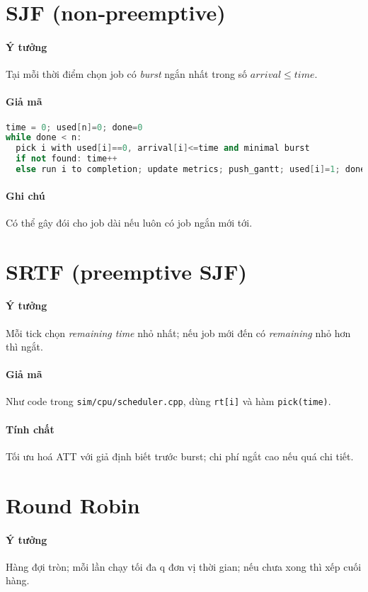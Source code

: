 \documentclass[12pt,a4paper]{report}
\begin{document}
\section{SJF (non‑preemptive)}
\paragraph{Ý tưởng} Tại mỗi thời điểm chọn job có \textit{burst} ngắn nhất trong số \(arrival \le time\).
\paragraph{Giả mã}
\begin{lstlisting}[language=C++]
time = 0; used[n]=0; done=0
while done < n:
  pick i with used[i]==0, arrival[i]<=time and minimal burst
  if not found: time++
  else run i to completion; update metrics; push_gantt; used[i]=1; done++
\end{lstlisting}
\paragraph{Ghi chú} Có thể gây đói cho job dài nếu luôn có job ngắn mới tới.

\section{SRTF (preemptive SJF)}
\paragraph{Ý tưởng} Mỗi tick chọn \textit{remaining time} nhỏ nhất; nếu job mới đến có \textit{remaining} nhỏ hơn thì ngắt.
\paragraph{Giả mã} Như code trong \texttt{sim/cpu/scheduler.cpp}, dùng \texttt{rt[i]} và hàm \texttt{pick(time)}.
\paragraph{Tính chất} Tối ưu hoá ATT với giả định biết trước burst; chi phí ngắt cao nếu quá chi tiết.

\section{Round Robin}
\paragraph{Ý tưởng} Hàng đợi tròn; mỗi lần chạy tối đa q đơn vị thời gian; nếu chưa xong thì xếp cuối hàng.
\end{document}
